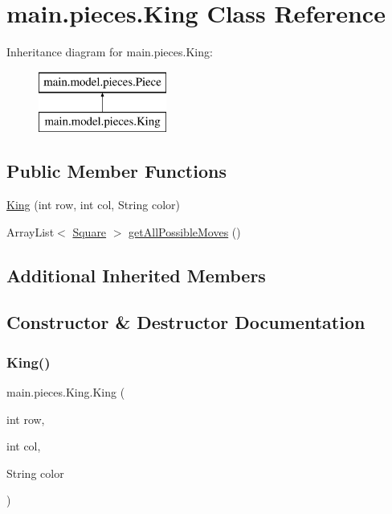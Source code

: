 \hypertarget{classmain_1_1pieces_1_1_king}{}\section{main.\+pieces.\+King Class Reference}
\label{classmain_1_1pieces_1_1_king}
Inheritance diagram for main.\+pieces.\+King\+:\begin{figure}[H]
\begin{center}
\leavevmode
\includegraphics[height=2.000000cm]{classmain_1_1pieces_1_1_king}
\end{center}
\end{figure}
\subsection*{Public Member Functions}
\begin{DoxyCompactItemize}
\item 
\hyperlink{classmain_1_1pieces_1_1_king_a907a47f5eb70cd8cdee24a5452d57150}{King} (int row, int col, String color)
\item 
Array\+List$<$ \hyperlink{classmain_1_1_square}{Square} $>$ \hyperlink{classmain_1_1pieces_1_1_king_a428c7c1471621c2abb8e9f085ac17f9d}{get\+All\+Possible\+Moves} ()
\end{DoxyCompactItemize}
\subsection*{Additional Inherited Members}


\subsection{Constructor \& Destructor Documentation}
\mbox{\label{classmain_1_1pieces_1_1_king_a907a47f5eb70cd8cdee24a5452d57150}} 
\subsubsection{\texorpdfstring{King()}{King()}}
{\footnotesize\ttfamily main.\+pieces.\+King.\+King (\begin{DoxyParamCaption}\item[{int}]{row,  }\item[{int}]{col,  }\item[{String}]{color }\end{DoxyParamCaption})\hspace{0.3cm}{\ttfamily [inline]}}

